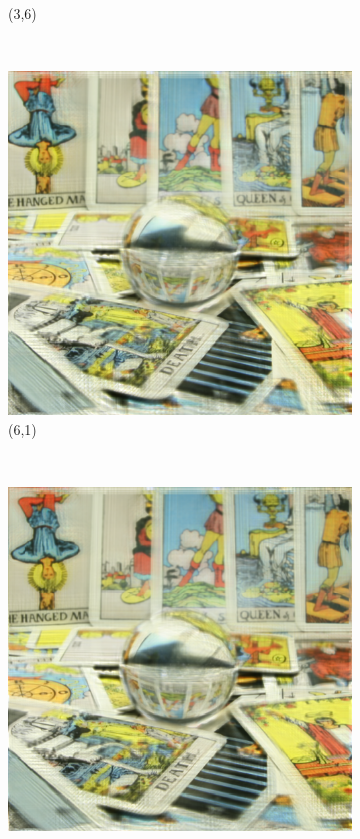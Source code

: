 \documentclass[11pt,a4paper,titlepage]{article}
\begin{document}
\begin{figure}
\begin{subfigure}[t]{0.3\textwidth}
		\caption{(3,6)}
	\end{subfigure}%
	\\
	\begin{subfigure}[t]{0.3\textwidth}
		\includegraphics[width=\textwidth]{results/tile_blending/tarot6x6x512x512-512x512x5-sampling=2x_tileRes=200x200_overlap=0.5/Reconstruction_of_view_(6,1).png} 
		\caption{(6,1)}
	\end{subfigure}%
	~
	\begin{subfigure}[t]{0.3\textwidth}
		\includegraphics[width=\textwidth]{results/tile_blending/tarot6x6x512x512-512x512x5-sampling=2x_tileRes=200x200_overlap=0.5/Reconstruction_of_view_(6,3).png} 

\end{subfigure}
\end{figure}
\end{document}
